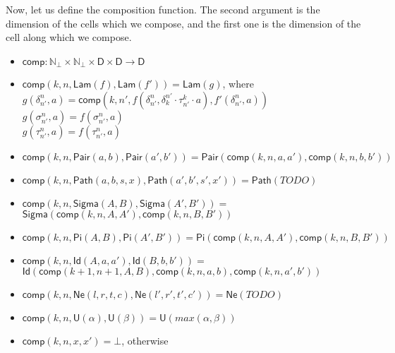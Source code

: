 \documentclass{amsart}
\theoremstyle{definition}
\theoremstyle{remark}
\newcommand{\D}{\mathsf{D}}
\newcommand{\nats}{\mathbb{N}}
\numberwithin{table}{section}
\begin{document}
Now, let us define the composition function.
The second argument is the dimension of the cells which we compose, and the first one is the dimension of the cell along which we compose.
\begin{itemize}
\item[] $\mathsf{comp} : \nats_\bot \times \nats_\bot \times \D \times \D \to \D$
\item[] $\mathsf{comp}(k, n, \mathsf{Lam}(f), \mathsf{Lam}(f')) = \mathsf{Lam}(g)$, where \\
    \indent $g(\delta^n_{n'},a) = \mathsf{comp}(k, n', f(\delta^n_{n'}, \delta^{n'}_k \cdot \tau^k_{n'} \cdot a), f'(\delta^n_{n'}, a))$ \\
    \indent $g(\sigma^n_{n'},a) = f(\sigma^n_{n'},a)$ \\
    \indent $g(\tau^n_{n'},a) = f(\tau^n_{n'},a)$
\item[] $\mathsf{comp}(k, n, \mathsf{Pair}(a,b), \mathsf{Pair}(a',b')) = \mathsf{Pair}(\mathsf{comp}(k,n,a,a'), \mathsf{comp}(k,n,b,b'))$
\item[] $\mathsf{comp}(k, n, \mathsf{Path}(a,b,s,x), \mathsf{Path}(a',b',s',x')) = \mathsf{Path}(TODO)$
\item[] $\mathsf{comp}(k, n, \mathsf{Sigma}(A,B), \mathsf{Sigma}(A',B')) =$ \\
    \indent $\mathsf{Sigma}(\mathsf{comp}(k, n, A, A'), \mathsf{comp}(k, n, B, B'))$
\item[] $\mathsf{comp}(k, n, \mathsf{Pi}(A,B), \mathsf{Pi}(A',B')) = \mathsf{Pi}(\mathsf{comp}(k, n, A, A'), \mathsf{comp}(k, n, B, B'))$
\item[] $\mathsf{comp}(k, n, \mathsf{Id}(A,a,a'), \mathsf{Id}(B,b,b')) =$ \\
    \indent $\mathsf{Id}(\mathsf{comp}(k + 1, n + 1, A, B), \mathsf{comp}(k, n, a, b), \mathsf{comp}(k, n, a', b'))$
\item[] $\mathsf{comp}(k, n, \mathsf{Ne}(l,r,t,c), \mathsf{Ne}(l',r',t',c')) = \mathsf{Ne}(TODO)$
\item[] $\mathsf{comp}(k, n, \mathsf{U}(\alpha), \mathsf{U}(\beta)) = \mathsf{U}(max(\alpha,\beta))$
\item[] $\mathsf{comp}(k, n, x, x') = \bot$, otherwise
\end{itemize}
\end{document}
